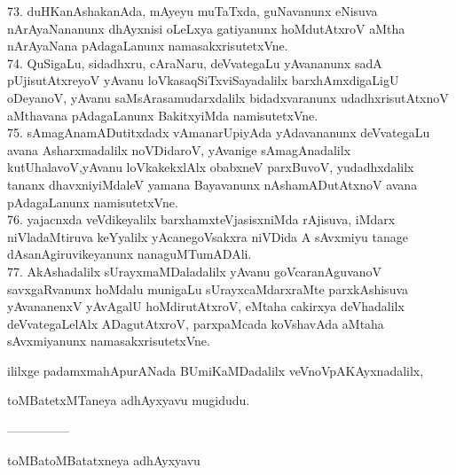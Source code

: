 \documentclass{article}
\begin{document}
73. duHKanAshakanAda, mAyeyu muTaTxda, guNavanunx eNisuva nArAyaNananunx dhAyxnisi oLeLxya gatiyanunx hoMdutAtxroV aMtha nArAyaNana pAdagaLanunx namasakxrisutetxVne.\\
74. QuSigaLu, sidadhxru, cAraNaru, deVvategaLu yAvananunx sadA pUjisutAtxreyoV yAvanu loVkasaqSiTxviSayadalilx barxhAmxdigaLigU oDeyanoV, yAvanu saMsArasamudarxdalilx bidadxvaranunx udadhxrisutAtxnoV aMthavana pAdagaLanunx BakitxyiMda namisutetxVne.\\
75. sAmagAnamADutitxdadx vAmanarUpiyAda yAdavananunx deVvategaLu avana Asharxmadalilx noVDidaroV, yAvanige sAmagAnadalilx kutUhalavoV,yAvanu loVkakekxlAlx obabxneV parxBuvoV, yudadhxdalilx tananx dhavxniyiMdaleV yamana Bayavanunx nAshamADutAtxnoV avana pAdagaLanunx namisutetxVne.\\
76. yajacnxda veVdikeyalilx barxhamxteVjasisxniMda rAjisuva, iMdarx niVladaMtiruva keYyalilx yAcanegoVsakxra niVDida A sAvxmiyu tanage dAsanAgiruvikeyanunx nanaguMTumADAli.\\
77. AkAshadalilx sUrayxmaMDaladalilx yAvanu goVcaranAguvanoV savxgaRvanunx hoMdalu munigaLu sUrayxcaMdarxraMte parxkAshisuva yAvananenxV yAvAgalU hoMdirutAtxroV, eMtaha cakirxya deVhadalilx deVvategaLelAlx ADagutAtxroV, parxpaMcada koVshavAda aMtaha sAvxmiyanunx namasakxrisutetxVne.

\begin{center}
ililxge padamxmahApurANada BUmiKaMDadalilx veVnoVpAKAyxnadalilx,
\end{center}

\begin{center}
toMBatetxMTaneya adhAyxyavu mugidudu.
\end{center}

\begin{center}
---------------
\end{center}

\begin{center}
toMBatoMBatatxneya adhAyxyavu
\end{center}
\end{document}
